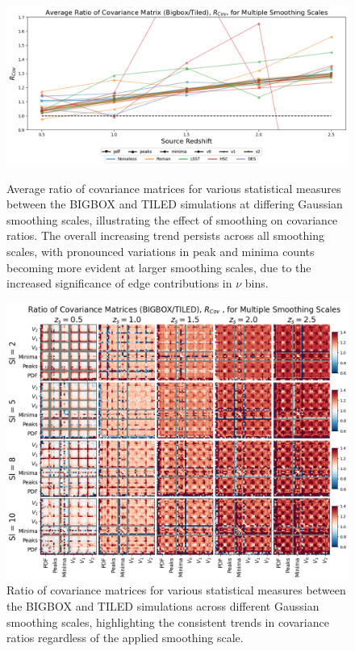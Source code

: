 \begin{figure}[p]
    \centering
    \includegraphics[width=\textwidth]{figures/results/avg_cov_ratio_sl.png}
    \caption[Average BIGBOX/TILED Ratio of Covariance for Multiple Smoothing Scales]
    {Average ratio of covariance matrices for various statistical measures between the BIGBOX and TILED simulations at differing Gaussian smoothing scales, illustrating the effect of smoothing on covariance ratios. The overall increasing trend persists across all smoothing scales, with pronounced variations in peak and minima counts becoming more evident at larger smoothing scales, due to the increased significance of edge contributions in $\nu$ bins.}
    \label{fig:avg_cov_sl}
    \includegraphics[width=\textwidth]{figures/results/cov_smoothing.png}
    \caption[BIGBOX/TILED Ratio of Covariance for Multiple Smoothing Scales]
    {Ratio of covariance matrices for various statistical measures between the BIGBOX and TILED simulations across different Gaussian smoothing scales, highlighting the consistent trends in covariance ratios regardless of the applied smoothing scale.}
    \label{fig:cov_smoothing}
\end{figure}

